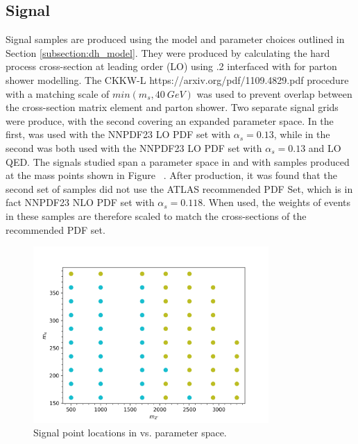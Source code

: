 \subsection{Signal}
\label{subsection:mc_signal}
Signal samples are produced using the model and parameter choices outlined in Section \ref{subsection:dh_model}. They were produced by calculating the hard process cross-section at leading order (LO) using .2 interfaced with  for parton shower modelling. The CKKW-L https://arxiv.org/pdf/1109.4829.pdf procedure with a matching scale of $min(m_s, 40~GeV)$ was used to prevent overlap between the cross-section matrix element and parton shower. Two separate signal grids were produce, with the second covering an expanded parameter space. In the first, \mgamc was used with the NNPDF23 LO PDF set with $\alpha_s = 0.13$, while in the second \mgamc was both used with the NNPDF23 LO PDF set with $\alpha_s = 0.13$ and LO QED. The signals studied span a parameter space in \ms and \mZp with samples produced at the mass points shown in Figure ~. After production, it was found that the second set of samples did not use the ATLAS recommended PDF Set, which is in fact NNPDF23 NLO PDF set with $\alpha_s = 0.118$. When used, the weights of events in these samples are therefore scaled to match the cross-sections of the recommended PDF set.

\begin{figure}[H]
    \centering
    \includegraphics[width=0.8\textwidth]{Figures/3/SignalGrid.png}
    \caption{Signal point locations in \ms vs. \mZp parameter space.}
    \label{fig:signal_grid}
\end{figure}

